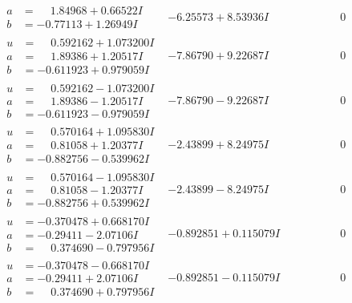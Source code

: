 \documentclass[1p]{elsarticle_modified}
\theoremstyle{definition}
\begin{document}
$$\begin{array}{c|c|c}
\begin{aligned}
a &= \phantom{-}1.84968 + 0.66522 I \\
b &= -0.77113 + 1.26949 I\end{aligned}
 & -6.25573 + 8.53936 I & \phantom{-0.000000 } 0 \\ \hline\begin{aligned}
u &= \phantom{-}0.592162 + 1.073200 I \\
a &= \phantom{-}1.89386 + 1.20517 I \\
b &= -0.611923 + 0.979059 I\end{aligned}
 & -7.86790 + 9.22687 I & \phantom{-0.000000 } 0 \\ \hline\begin{aligned}
u &= \phantom{-}0.592162 - 1.073200 I \\
a &= \phantom{-}1.89386 - 1.20517 I \\
b &= -0.611923 - 0.979059 I\end{aligned}
 & -7.86790 - 9.22687 I & \phantom{-0.000000 } 0 \\ \hline\begin{aligned}
u &= \phantom{-}0.570164 + 1.095830 I \\
a &= \phantom{-}0.81058 + 1.20377 I \\
b &= -0.882756 - 0.539962 I\end{aligned}
 & -2.43899 + 8.24975 I & \phantom{-0.000000 } 0 \\ \hline\begin{aligned}
u &= \phantom{-}0.570164 - 1.095830 I \\
a &= \phantom{-}0.81058 - 1.20377 I \\
b &= -0.882756 + 0.539962 I\end{aligned}
 & -2.43899 - 8.24975 I & \phantom{-0.000000 } 0 \\ \hline\begin{aligned}
u &= -0.370478 + 0.668170 I \\
a &= -0.29411 - 2.07106 I \\
b &= \phantom{-}0.374690 - 0.797956 I\end{aligned}
 & -0.892851 + 0.115079 I & \phantom{-0.000000 } 0 \\ \hline\begin{aligned}
u &= -0.370478 - 0.668170 I \\
a &= -0.29411 + 2.07106 I \\
b &= \phantom{-}0.374690 + 0.797956 I\end{aligned}
 & -0.892851 - 0.115079 I & \phantom{-0.000000 } 0 \\ \hline\begin{aligned}

\end{aligned}
\end{array}$$
\end{document}
